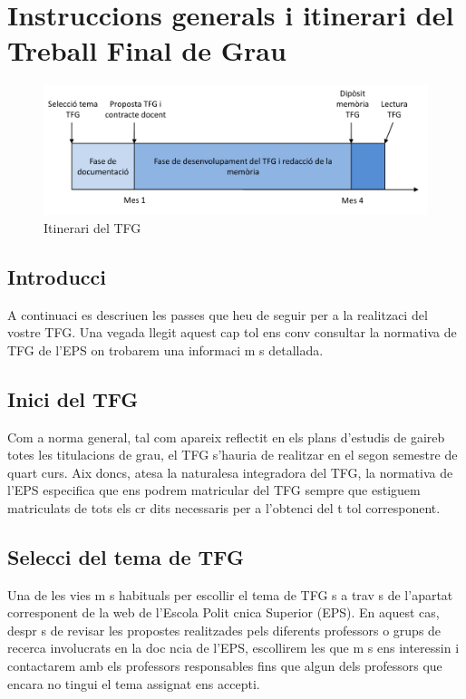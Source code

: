 
\chapter{Instruccions generals i itinerari del Treball Final de Grau }\label{instruccions}
\begin{figure}
\centering
\includegraphics[width=\linewidth]{Itinerari_TFG}
\caption{\label{fig:itinerari}Itinerari del TFG}
\end{figure}
\section{Introducci }
A continuaci  es descriuen les passes que heu de seguir per a la realitzaci  del vostre TFG. Una vegada llegit aquest cap tol ens conv  consultar la normativa de TFG  de l'EPS on trobarem una informaci  m s detallada.
\section{Inici del TFG}

Com a norma general, tal com apareix reflectit en els plans d'estudis de gaireb  totes les titulacions de grau, el TFG s'hauria de realitzar en el segon semestre de quart curs.  Aix  doncs, atesa la naturalesa integradora del TFG, la normativa de l'EPS especifica que ens podrem matricular del TFG sempre que estiguem matriculats de tots els cr dits necessaris per a l'obtenci  del t tol corresponent.  
\section{Selecci  del tema de TFG}

Una de les vies m s habituals per escollir el tema de TFG  s a trav s de l'apartat corresponent de la web de l'Escola Polit cnica Superior (EPS). En aquest cas, despr s de revisar les propostes realitzades pels diferents professors o grups de recerca involucrats en la doc ncia de l'EPS, escollirem les que m s ens interessin i contactarem amb els professors responsables fins que algun dels professors que encara no tingui el tema assignat ens accepti. %

